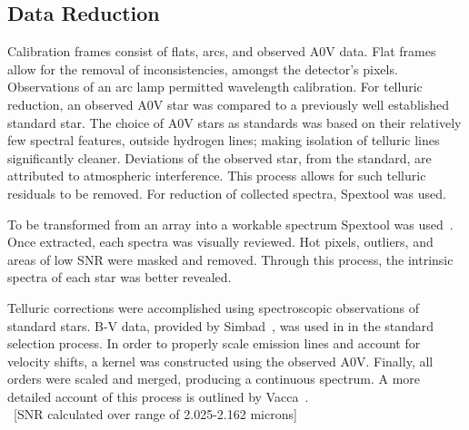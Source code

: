 \subsection{Data Reduction}


Calibration frames consist of flats, arcs, and observed A0V data.  Flat frames allow for the removal of inconsistencies, amongst the detector's pixels.  Observations of an arc lamp permitted wavelength calibration.  For telluric reduction, an observed A0V star was compared to a previously well established standard star.  The choice of A0V stars as standards was based on their relatively few spectral features, outside hydrogen lines; making isolation of telluric lines significantly cleaner.  
Deviations of the observed star, from the standard, are attributed to atmospheric interference.  This process allows for such telluric residuals to be removed.  For reduction of collected spectra, Spextool was used.





To be transformed from an array into a workable spectrum Spextool was used~\cite{Cushing_2004}.  Once extracted, each spectra was visually reviewed.  Hot pixels, outliers, and areas of low SNR were masked and removed.  Through this process, the intrinsic spectra of each star was better revealed.


Telluric corrections were accomplished using spectroscopic observations of standard stars. B-V data, provided by Simbad~\cite{simbad}, was used in in the standard selection process.
In order to properly scale emission lines and account for velocity shifts, a kernel was constructed using the observed A0V.  Finally, all orders were scaled and merged, producing a continuous spectrum.
A more detailed account of this process is outlined by Vacca~\cite{Vacca_2003}.\\



~[SNR calculated over range of 2.025-2.162 microns]\\